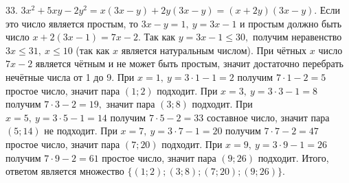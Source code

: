 33. $3x^2+5xy-2y^2=x(3x-y)+2y(3x-y)=(x+2y)(3x-y).$ Если это число является простым, то $3x-y=1,\ y=3x-1$ и простым должно быть число $x+2(3x-1)=7x-2.$ Так как $y=3x-1\leqslant30,$ получим неравенство $3x\leqslant31,\ x\leqslant 10$ (так как $x$ является натуральным числом). При чётных $x$ число $7x-2$ является чётным и не может быть простым, значит достаточно перебрать нечётные числа от 1 до 9. При $x=1,\ y=3\cdot1-1=2$ получим $7\cdot1-2=5$ простое число, значит пара $(1;2)$ подходит. При $x=3,\ y=3\cdot3-1=8$ получим $7\cdot3-2=19,$ значит пара $(3;8)$ подходит. При $x=5,\ y=3\cdot5-1=14$ получим $7\cdot5-2=33$ составное число, значит пара $(5;14)$ не подходит. При $x=7,\ y=3\cdot7-1=20$ получим $7\cdot7-2=47$ простое число, значит пара $(7;20)$ подходит. При $x=9,\ y=3\cdot9-1=26$ получим $7\cdot9-2=61$ простое число, значит пара $(9;26)$ подходит. Итого, ответом является множество $\{(1;2); (3;8); (7;20); (9;26)\}.$\\
